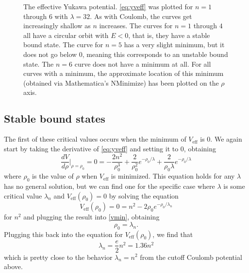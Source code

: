 \documentclass[12pt,twoside]{reedthesis}
\begin{document}
\begin{figure}[h]
\caption[The effective Yukawa potential]{The effective Yukawa potential. \eqref{eq:yveff} was plotted for $n = 1$ through $6$ with $\lambda = 32$. As with Coulomb, the curves get increasingly shallow as $n$ increases. The curves for $n = 1$ through $4$ all have a circular orbit with $E < 0$, that is, they have a stable bound state. The curve for $n = 5$ has a very slight minimum, but it does not go below $0$, meaning this corresponds to an unstable bound state. The $n = 6$ curve does not have a minimum at all. For all curves with a minimum, the approximate location of this minimum (obtained via Mathematica's NMinimize) has been plotted on the $\rho$ axis.}
\label{fig:yveff}
\end{figure}

\subsection{Stable bound states}
The first of these critical values occurs when the minimum of $V_{\mathrm{eff}}$ is 0. We again start by taking the derivative of \eqref{eq:yveff} and setting it to 0, obtaining
\begin{equation}
\frac{dV}{d\rho}\Big |_{\rho = \rho_0} =0 = -\frac{2n^2}{\rho_0^3} + \frac{2}{\rho_0^2}e^{-\rho_0/\lambda} + \frac{2}{\rho_0 \lambda} e^{-\rho_0/\lambda}
\label{vmin}
\end{equation}
where $\rho_0$ is the value of $\rho$ when $V_{\mathrm{eff}}$ is minimized. This equation holds for any $\lambda$ has no general solution, but we can find one for the specific case where $\lambda$ is some critical value $\lambda_n$ and $V_{\mathrm{eff}}(\rho_0) = 0$ by solving the equation
\begin{equation}
V_{\mathrm{eff}}(\rho_0)=0 = n^2 - 2\rho_0 e^{-\rho_0/\lambda_n} 
\end{equation}
for $n^2$
and plugging the result into \eqref{vmin}, obtaining
\begin{equation}
\rho_0 = \lambda_n \mbox{.}
\end{equation}
Plugging this back into the equation for $V_{\mathrm{eff}}(\rho_0)$, we find that
\begin{equation}
\lambda_n=\frac{e}{2}n^2=1.36 n^2
\label{eq:stable}
\end{equation}
which is pretty close to the behavior $\lambda_{n} = n^2$ from the cutoff Coulomb potential above. 
\end{document}
